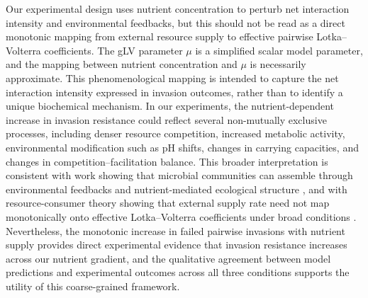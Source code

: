Our experimental design uses nutrient concentration to perturb net interaction intensity and environmental feedbacks, but this should not be read as a direct monotonic mapping from external resource supply to effective pairwise Lotka--Volterra coefficients. The gLV parameter $\mu$ is a simplified scalar model parameter, and the mapping between nutrient concentration and $\mu$ is necessarily approximate. This phenomenological mapping is intended to capture the net interaction intensity expressed in invasion outcomes, rather than to identify a unique biochemical mechanism. In our experiments, the nutrient-dependent increase in invasion resistance could reflect several non-mutually exclusive processes, including denser resource competition, increased metabolic activity, environmental modification such as pH shifts, changes in carrying capacities, and changes in competition--facilitation balance. This broader interpretation is consistent with work showing that microbial communities can assemble through environmental feedbacks and nutrient-mediated ecological structure \citep{Goldford2018,Estrela2021}, and with resource-consumer theory showing that external supply rate need not map monotonically onto effective Lotka--Volterra coefficients under broad conditions \citep{DuanPawar2025}. Nevertheless, the monotonic increase in failed pairwise invasions with nutrient supply provides direct experimental evidence that invasion resistance increases across our nutrient gradient, and the qualitative agreement between model predictions and experimental outcomes across all three conditions supports the utility of this coarse-grained framework.

